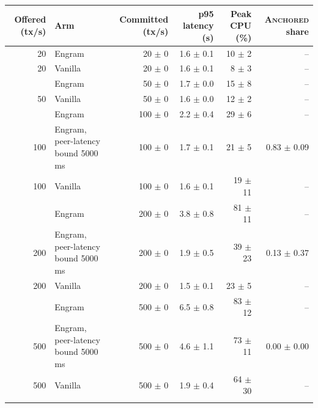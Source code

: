 \begin{tabular}{@{}rlrrrr@{}}
\toprule
\textbf{Offered (tx/s)} & \textbf{Arm} & \textbf{Committed (tx/s)} & \textbf{p95 latency (s)} & \textbf{Peak CPU (\%)} & \textbf{\textsc{Anchored} share} \\
\midrule
20 & Engram & 20 $\pm$ 0 & 1.6 $\pm$ 0.1 & 10 $\pm$ 2 & -- \\
20 & Vanilla & 20 $\pm$ 0 & 1.6 $\pm$ 0.1 & 8 $\pm$ 3 & -- \\
\addlinespace
50 & Engram & 50 $\pm$ 0 & 1.7 $\pm$ 0.0 & 15 $\pm$ 8 & -- \\
50 & Vanilla & 50 $\pm$ 0 & 1.6 $\pm$ 0.0 & 12 $\pm$ 2 & -- \\
\addlinespace
100 & Engram & 100 $\pm$ 0 & 2.2 $\pm$ 0.4 & 29 $\pm$ 6 & -- \\
100 & Engram, peer-latency bound 5000\,ms & 100 $\pm$ 0 & 1.7 $\pm$ 0.1 & 21 $\pm$ 5 & 0.83 $\pm$ 0.09 \\
100 & Vanilla & 100 $\pm$ 0 & 1.6 $\pm$ 0.1 & 19 $\pm$ 11 & -- \\
\addlinespace
200 & Engram & 200 $\pm$ 0 & 3.8 $\pm$ 0.8 & 81 $\pm$ 11 & -- \\
200 & Engram, peer-latency bound 5000\,ms & 200 $\pm$ 0 & 1.9 $\pm$ 0.5 & 39 $\pm$ 23 & 0.13 $\pm$ 0.37 \\
200 & Vanilla & 200 $\pm$ 0 & 1.5 $\pm$ 0.1 & 23 $\pm$ 5 & -- \\
\addlinespace
500 & Engram & 500 $\pm$ 0 & 6.5 $\pm$ 0.8 & 83 $\pm$ 12 & -- \\
500 & Engram, peer-latency bound 5000\,ms & 500 $\pm$ 0 & 4.6 $\pm$ 1.1 & 73 $\pm$ 11 & 0.00 $\pm$ 0.00 \\
500 & Vanilla & 500 $\pm$ 0 & 1.9 $\pm$ 0.4 & 64 $\pm$ 30 & -- \\
\addlinespace
\bottomrule
\end{tabular}
